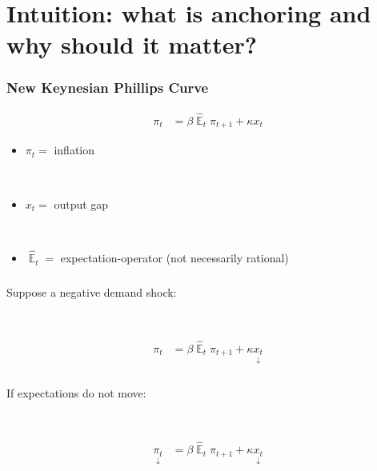\documentclass{beamer}
\DeclareMathOperator{\E}{\mathbb{E}}
\begin{document}
\section{Intuition: what is anchoring and why should it matter?}
\begin{frame}
	\frametitle{New Keynesian Phillips Curve}

\begin{align*}
\pi_t & = \beta \hat{\E}_t\pi_{t+1} + \kappa x_t
\end{align*}

\begin{itemize}
\item $\pi_t = $ inflation

\

\item $x_t =$ output gap

\

\item $\hat{\E}_t =$ expectation-operator (not necessarily rational)


\end{itemize}



\end{frame}

\begin{frame}
	\frametitle{}

Suppose a negative demand shock:

\

\begin{align*}
\pi_t & = \beta \hat{\E}_t\pi_{t+1} + \kappa \underset{\downarrow}{x_t} 
\end{align*}




\end{frame}

\begin{frame}
	\frametitle{}

If expectations do not move:

\

\begin{align*}
\underset{\downarrow}{\pi_t} & = \beta \hat{\E}_t\pi_{t+1}+ \kappa \underset{\downarrow}{x_t} 
\end{align*}




\end{frame}
\end{document}
